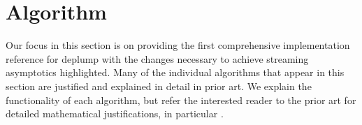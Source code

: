\section{Algorithm}
%
%

Our focus in this section is on providing the first comprehensive implementation reference for deplump with the changes necessary to achieve streaming asymptotics highlighted.  Many of the individual algorithms that appear in this section are justified and explained in detail in prior art.  We explain the functionality of each algorithm, but refer the interested reader to the prior art for detailed mathematical justifications, in particular \citep{Wood2009,Gasthaus2010,Bartlett2010}.

